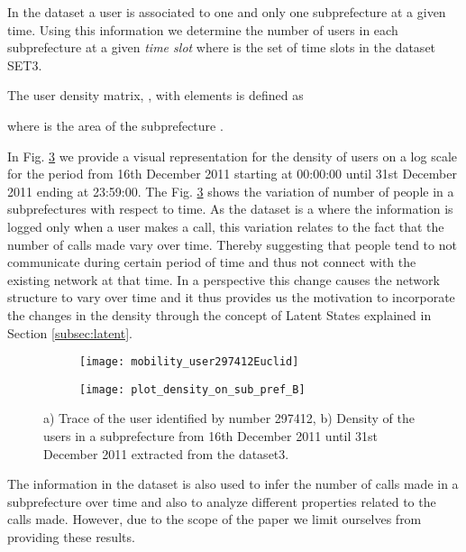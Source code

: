 \documentclass[review]{elsarticle}
\begin{document}
In the dataset a user is associated to one and only one subprefecture at a given time. Using this information we determine the number of users in each subprefecture  at a given \emph{time slot}  where  is the set of time slots in the dataset SET3.
\begin{definition}\label{defdm}
The user density matrix, , with elements  is defined as

where  is the area of the subprefecture .
\end{definition}

In Fig. \ref{fig:densityuserdata} we provide a visual representation for the density of users on a log scale for the period from 16th December 2011 starting at 00:00:00 until 31st December 2011 ending at 23:59:00. The Fig. \ref{fig:densityuserdata} shows the variation of number of people in a subprefectures with respect to time. As the dataset is a  where the information is logged only when a user makes a call, this variation relates to the fact that the number of calls made vary over time. Thereby suggesting that people tend to not communicate during certain period of time and thus not connect with the existing network at that time. In a  perspective this change causes the network structure to vary over time and it thus provides us the motivation to incorporate the changes in the density through the concept of Latent States explained in Section \ref{subsec:latent}.


\begin{figure}
    \centering
    \begin{subfigure}[b]{0.35\textwidth}
        \texttt{[image: mobility\_user297412Euclid]}
	\caption{}
        \label{fig:mobilityeuclid}
    \end{subfigure}
    \begin{subfigure}[b]{0.55\textwidth}
        \texttt{[image: plot\_density\_on\_sub\_pref\_B]}
	\caption{}
        \label{fig:densityuserdata}
    \end{subfigure}
    \caption{a) Trace of the user identified by number 297412, b) Density of the users in a subprefecture from 16th December 2011 until 31st December 2011 extracted from the dataset3. }
\end{figure}

The information in the dataset is also used to infer the number of calls made in a subprefecture over time and also to analyze different properties related to the calls made. However, due to the scope of the paper we limit ourselves from providing these results.
\end{document}
